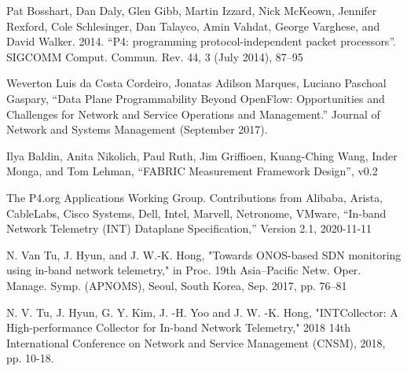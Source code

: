 \documentclass[conference]{IEEEtran}
\begin{document}
\begin{thebibliography}{00}
 Pat Bosshart, Dan Daly, Glen Gibb, Martin Izzard, Nick McKeown, Jennifer Rexford, Cole Schlesinger, Dan Talayco, Amin Vahdat, George Varghese, and David Walker. 2014. “P4: programming protocol-independent packet processors”. SIGCOMM Comput. Commun. Rev. 44, 3 (July 2014), 87–95

 Weverton Luis da Costa Cordeiro, Jonatas Adilson Marques, Luciano Paschoal Gaspary, “Data Plane Programmability Beyond OpenFlow: Opportunities and Challenges for Network and Service Operations and Management.” Journal of Network and Systems Management (September 2017).

 Ilya Baldin, Anita Nikolich, Paul Ruth, Jim Griffioen, Kuang-Ching Wang, Inder Monga, and Tom Lehman, “FABRIC Measurement Framework Design”, v0.2

 The P4.org Applications Working Group. Contributions from Alibaba, Arista, CableLabs, Cisco Systems, Dell, Intel, Marvell, Netronome, VMware, “In-band Network Telemetry (INT) Dataplane Specification,” Version 2.1, 2020-11-11

 N. Van Tu, J. Hyun, and J. W.-K. Hong, "Towards ONOS-based SDN monitoring using in-band network telemetry," in Proc. 19th Asia–Pacific Netw. Oper. Manage. Symp. (APNOMS), Seoul, South Korea, Sep. 2017, pp. 76–81

 N. V. Tu, J. Hyun, G. Y. Kim, J. -H. Yoo and J. W. -K. Hong, "INTCollector: A High-performance Collector for In-band Network Telemetry," 2018 14th International Conference on Network and Service Management (CNSM), 2018, pp. 10-18.
\end{thebibliography}
\end{document}
